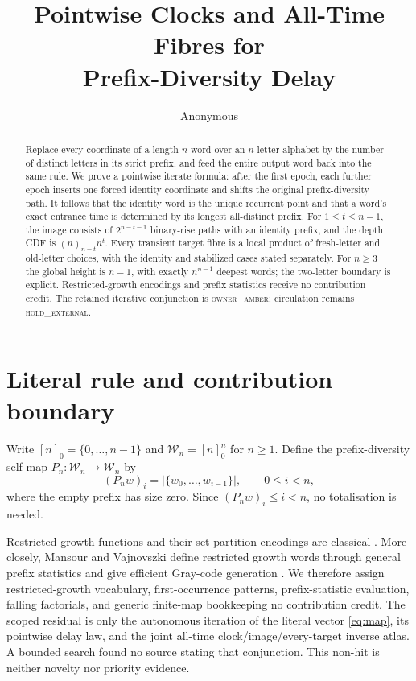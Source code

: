 \documentclass[a4paper,10pt]{amsart}
\title[Prefix-diversity delay]{Pointwise Clocks and All-Time Fibres for\\
Prefix-Diversity Delay}
\author{Anonymous}
\date{}
\theoremstyle{remark}
\newcommand{\W}{\mathcal W}
\begin{document}
\begin{abstract}
Replace every coordinate of a length-$n$ word over an $n$-letter alphabet by
the number of distinct letters in its strict prefix, and feed the entire
output word back into the same rule.  We prove a pointwise iterate formula:
after the first epoch, each further epoch inserts one forced identity
coordinate and shifts the original prefix-diversity path.  It follows that
the identity word is the unique recurrent point and that a word's exact
entrance time is determined by its longest all-distinct prefix.  For
$1\le t\le n-1$, the image consists of $2^{n-t-1}$ binary-rise paths with
an identity prefix, and the depth CDF is $(n)_{n-t}n^t$.  Every transient
target fibre is a local product of fresh-letter and old-letter choices, with
the identity and stabilized cases stated separately.  For $n\ge3$ the global height
is $n-1$, with exactly $n^{n-1}$ deepest words; the two-letter boundary is
explicit.  Restricted-growth encodings and prefix statistics receive no
contribution credit.  The retained iterative
conjunction is \textsc{owner\_amber}; circulation remains
\textsc{hold\_external}.
\end{abstract}

\maketitle

\section{Literal rule and contribution boundary}

Write $[n]_0=\{0,\ldots,n-1\}$ and $\W_n=[n]_0^n$ for $n\ge1$.  Define the
prefix-diversity self-map $P_n:\W_n\to\W_n$ by
\begin{equation}\label{eq:map}
 (P_nw)_i=|\{w_0,\ldots,w_{i-1}\}|,
 \qquad 0\le i<n,
\end{equation}
where the empty prefix has size zero.  Since $(P_nw)_i\le i<n$, no
totalisation is needed.

Restricted-growth functions and their set-partition encodings are classical
\cite{Wachs1994}.  More closely, Mansour and Vajnovszki define restricted
growth words through general prefix statistics and give efficient Gray-code
generation \cite{MansourVajnovszki2013}.  We therefore assign
restricted-growth vocabulary, first-occurrence patterns, prefix-statistic
evaluation, falling factorials, and generic finite-map bookkeeping no
contribution credit.  The scoped residual is only the autonomous iteration
of the literal vector \eqref{eq:map}, its pointwise delay law, and the joint
all-time clock/image/every-target inverse atlas.  A bounded search found no
source stating that conjunction.  This non-hit is neither novelty nor
priority evidence.
\end{document}
